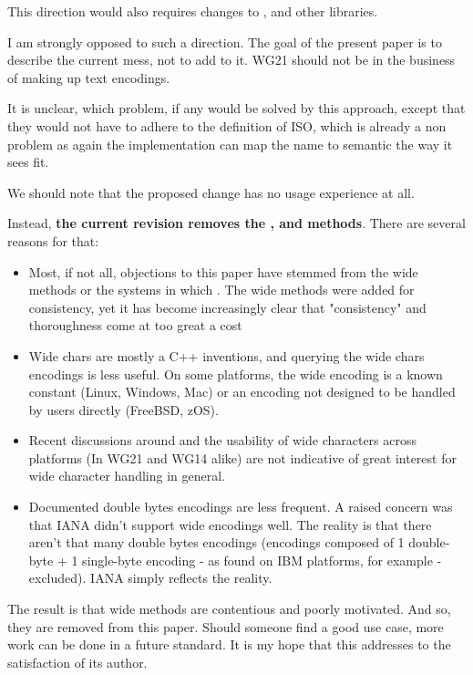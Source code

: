 \documentclass{wg21}
\begin{document}
This direction would also requires changes to ,  and other libraries.

I am strongly opposed to such a direction. The goal of the present paper is to describe the current mess, not to add to it.
WG21 should not be in the business of making up text encodings.

It is unclear, which problem, if any would be solved by this approach, except that they would not have to adhere to the definition of ISO, which is already a non problem as again the implementation can map the name to semantic the way it sees fit.

We should note that the proposed change has no usage experience at all.

Instead, \textbf{the current revision removes the ,  and  methods}.
There are several reasons for that:
\begin{itemize}
    \item Most, if not all, objections to this paper have stemmed from the wide methods or the systems in which . The wide methods were added for consistency, yet it has become increasingly clear that "consistency" and thoroughness come at too great a cost
    \item Wide chars are mostly a C++ inventions, and querying the wide chars encodings is less useful. On some platforms, the wide encoding is a known constant (Linux, Windows, Mac) or an encoding not designed to be handled by users directly (FreeBSD, zOS).
    \item Recent discussions around  and the usability of wide characters across platforms (In WG21 and WG14 alike) are not indicative of great interest for wide character handling in general.
    \item Documented double bytes encodings are less frequent. A raised concern was that IANA didn't support wide encodings well. The reality is that there aren't that many double bytes encodings (encodings composed of 1 double-byte + 1 single-byte encoding - as found on IBM platforms, for example - excluded). IANA simply reflects the reality.
\end{itemize}

The result is that wide methods are contentious and poorly motivated. And so, they are removed from this paper.
Should someone find a good use case, more work can be done in a future standard.
It is my hope that this addresses  to the satisfaction of its author.
\end{document}
